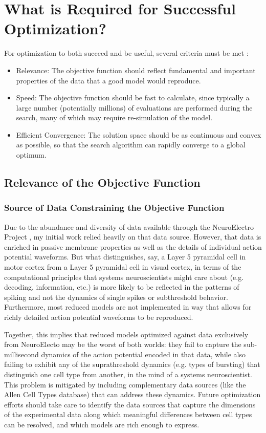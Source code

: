 \section{What is Required for Successful Optimization?}
For optimization to both succeed and be useful, several criteria must be met \citep{van2007neurofitter}:
\begin{itemize}
\item Relevance: The objective function should reflect fundamental and important properties of the data that a good model would reproduce.
\item Speed: The objective function should be fast to calculate, since typically a large number (potentially millions) of evaluations are performed during the search, many of which may require re-simulation of the model.
\item Efficient Convergence: The solution space should be as continuous and convex as possible, so that the search algorithm can rapidly converge to a global optimum.
\end{itemize}


\subsection{Relevance of the Objective Function}
\subsubsection{Source of Data Constraining the Objective Function}
Due to the abundance and diversity of data available through the NeuroElectro Project \cite{tripathy2014neuroelectro}, my initial work relied heavily on that data source.
However, that data is enriched in passive membrane properties as well as the details of individual action potential waveforms.
But what distinguishes, say, a Layer 5 pyramidal cell in motor cortex from a Layer 5 pyramidal cell in visual cortex, in terms of the computational principles that systems neuroscientists might care about (e.g. decoding, information, etc.) is more likely to be reflected in the patterns of spiking and not the dynamics of single spikes or subthreshold behavior.
Furthermore, most reduced models are not implemented in way that allows for richly detailed action potential waveforms to be reproduced.

Together, this implies that reduced models optimized against data exclusively from NeuroElecto may be the worst of both worlds: they fail to capture the sub-millisecond dynamics of the action potential encoded in that data, while also failing to exhibit any of the suprathreshold dynamics (e.g. types of bursting) that distinguish one cell type from another, in the mind of a systems neuroscientist.
This problem is mitigated by including complementary data sources (like the Allen Cell Types database) that can address these dynamics.
Future optimization efforts should take care to identify the data sources that capture the dimensions of the experimental data along which meaningful differences between cell types can be resolved, and which models are rich enough to express.

